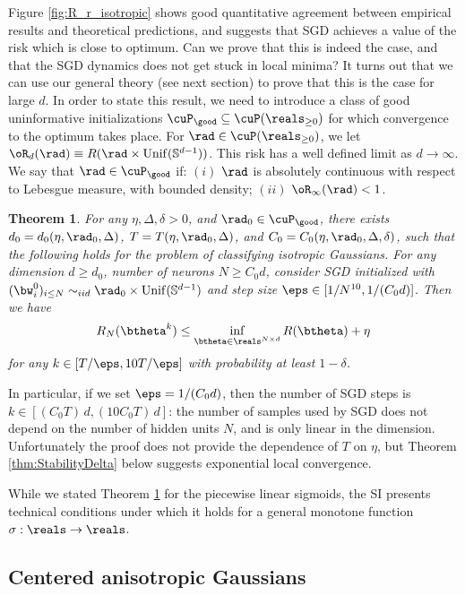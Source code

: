 \documentclass[11pt]{article}
\newtheorem{theorem}{Theorem}
\begin{document}
Figure \ref{fig:R_r_isotropic} shows good quantitative  agreement between empirical results and theoretical predictions,
and suggests that SGD  achieves a value of the risk which is close to optimum. 
Can we prove that this is indeed the case, and that the SGD dynamics does not get stuck in local minima?
It turns out that we can use our general  theory (see next section) to prove that this is the case for large $d$.
In order to state this result, we need to introduce a class of good
uninformative initializations $\cuP_{\good}\subseteq\cuP(\reals_{\ge 0})$ for which convergence to the optimum takes place.
For $\rad\in\cuP(\reals_{\ge 0})$, we let $\oR_d(\rad) \equiv R(\rad \times {\rm Unif}(\mathbb S^{d - 1}))$. This risk has a well defined limit as $d\to\infty$.
We say that $\rad\in\cuP_{\good}$ if: $(i)$ $\rad$ is absolutely continuous with respect to Lebesgue measure, with bounded density; $(ii)$ $\oR_{\infty}(\rad) < 1$.
%
\begin{theorem}\label{thm:ConvergenceIsotropic}
For any $\eta, \Delta, \delta > 0$, and $\rad_0 \in \cuP_{\good}$, there exists $d_0 = d_0(\eta, \rad_0, \Delta)$, $T = T(\eta, \rad_0, \Delta)$, and
$C_0 = C_0(\eta, \rad_0, \Delta, \delta)$, such that the following holds for the problem of classifying isotropic Gaussians. For any dimension $d \ge d_0$, number of neurons 
$N \ge C_0 d$, consider SGD initialized  with $(\bw_i^0)_{i \le N}
\sim_{iid} \rad_0 \times {\rm Unif}(\mathbb S^{d - 1})$ and step size
$\eps \in [1/N^{10}, 1/(C_0 d)]$. Then we have 
%
\begin{align}
R_{ N}(\btheta^{k}) \le \inf_{\btheta\in\reals^{N\times d}} R(\btheta)
+ \eta
\end{align}
 for any $k \in [T/\eps, 10 T/\eps]$ with probability at least $1 - \delta$.
\end{theorem}
%
In particular, if we set $\eps = 1/(C_0 d)$, then the number of SGD steps is $k\in [(C_0T)\, d, (10C_0T)\, d]$:
the number of samples used by SGD does not depend on the number of hidden units $N$, and 
is only linear in the dimension. Unfortunately the proof does not provide the dependence of $T$ on $\eta$, but
Theorem \ref{thm:StabilityDelta} below suggests exponential local convergence. 

While we stated Theorem \ref{thm:ConvergenceIsotropic} for the
piecewise linear sigmoids, the SI presents technical conditions under which it holds for a general monotone function $\sigma: \reals\to\reals$.

\subsection{Centered anisotropic Gaussians}
\end{document}

